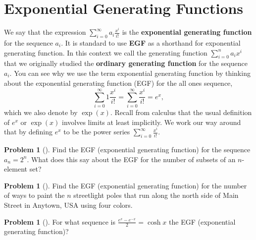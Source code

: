 \documentclass[10pt,]{book}
\newcommand{\terminology}[1]{\textbf{#1}}
\theoremstyle{plain}
\theoremstyle{definition}
\newtheorem{activity}[project]{Problem}
\theoremstyle{definition}
\numberwithin{equation}{chapter}
\begin{document}
\section[{Exponential Generating Functions}]{Exponential Generating Functions}\label{app3-2-expogenfns}
We say that the expression \(\sum_{i=0}^\infty a_i\frac{x^i}{i!}\) is the \terminology{exponential generating function} for the sequence \(a_i\). It is standard to use \terminology{EGF} as a shorthand for exponential generating function. In this context we call the generating function \(\sum_{i=0}^n a_ix^i\) that we originally studied the \terminology{ordinary generating function} for the sequence \(a_i\). You can see why we use the term exponential generating function by thinking about the exponential generating function (EGF) for the all ones sequence,%
\begin{equation*}
\sum_{i=0}^\infty 1\frac{x^i}{i!} = \sum_{i=0}^\infty \frac{x^i}{i!}
=e^x,
\end{equation*}
which we also denote by \(\exp (x)\). Recall from calculus that the usual definition of \(e^x\) or \(\exp(x)\) involves limits at least implicitly. We work our way around that by defining \(e^x\) to be the power series \(\sum_{i=0}^\infty
\frac{x^i}{i!}\).%
\begin{activity}[] \label{egf2n}
Find the EGF (exponential generating function) for the sequence \(a_n=2^n\). What does this say about the EGF for the number of subsets of an \(n\)-element set?%
\end{activity}
\begin{activity}[] \label{paintinglightpoles}
Find the EGF (exponential generating function) for the number of ways to paint the \(n\) streetlight poles that run along the north side of Main Street in Anytown, USA using four colors.%
\end{activity}
\begin{activity}[]\marginsymbol[-1em]{} \label{activity-374}
For what sequence is \(\frac{e^x-e^{-x}}{2} =\cosh x\) the EGF (exponential generating function)?%
\end{activity}
\end{document}
